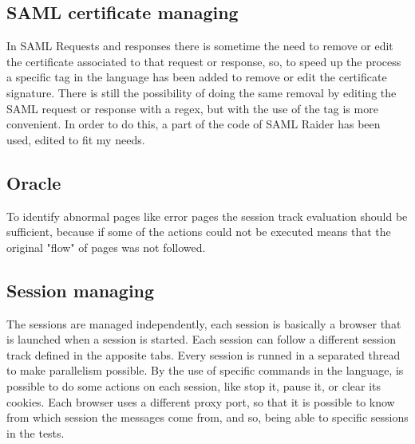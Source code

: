 \subsection{SAML certificate managing}
In SAML Requests and responses there is sometime the need to remove or edit the certificate associated to that request or response, so, to speed up the process a specific tag in the language has been added to remove or edit the certificate signature. There is still the possibility of doing the same removal by editing the SAML request or response with a regex, but with the use of the tag is more convenient.
In order to do this, a part of the code of SAML Raider \cite{saml_raider} has been used, edited to fit my needs.

\subsection{Oracle}
To identify abnormal pages like error pages the \gls{session track} evaluation should be sufficient, because if some of the actions could not be executed means that the original "flow" of pages was not followed.

\subsection{Session managing}
The sessions are managed independently, each session is basically a browser that is launched when a session is started. Each session can follow a different \gls{session track} defined in the apposite tabs. Every session is runned in a separated thread to make parallelism possible. By the use of specific commands in the language, is possible to do some actions on each session, like stop it, pause it, or clear its cookies. Each browser uses a different proxy port, so that it is possible to know from which session the messages come from, and so, being able to specific sessions in the tests.




